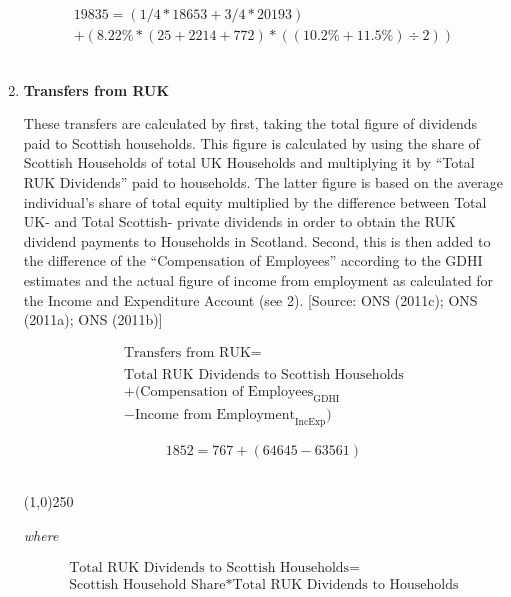\begin{enumerate}
\begin{equation} \nonumber
\begin{split}
19835 = (1/4*18653+3/4*20193)\\
+(8.22\%*(25+2214+772)*((10.2\%+11.5\%)\div 2))
\end{split}
\end{equation}\\


\item \textbf {Transfers from RUK}

These transfers are calculated by first, taking the total figure of dividends paid to Scottish households. This figure is calculated by using the share of Scottish Households of total UK Households and multiplying it by “Total RUK Dividends” paid to households. The latter figure is based on the average individual’s share of total equity multiplied by the difference between Total UK- and Total Scottish- private dividends in order to obtain the RUK dividend payments to Households in Scotland. 
Second, this is then added to the difference of the “Compensation of Employees” according to the GDHI estimates and the actual figure of income from employment as calculated for the Income and Expenditure Account (see 2). [Source: ONS (2011c); ONS (2011a); ONS (2011b)]


\begin{equation}
\begin{split}
\text{Transfers from RUK} =  \\ \\
\text{Total RUK Dividends to Scottish Households}\\
+(\text{Compensation of Employees}_\text{GDHI}\\
-\text{Income from Employment}_\text{IncExp})
\end{split} \label{eq:2.5.9}
\end{equation}

\begin{equation} \nonumber
1852 = 767+(64645-63561)
\end{equation}\\

\begin{center}
\line(1,0){250}
\end{center}

\textit{where}

\begin{equation}
\begin{split}
\text{Total RUK Dividends to Scottish Households}=\\
\text{Scottish Household Share}*\text{Total RUK Dividends to Households}
\end{split} \label{eq:2.5.10}
\end{equation}


\end{enumerate}
